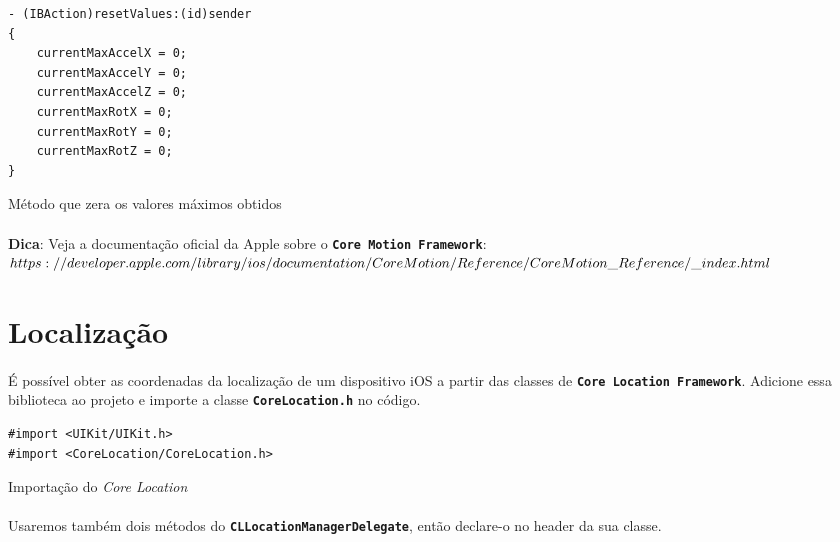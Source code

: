 \documentclass[a4paper,12pt,brazil,doubleside]{book}
\begin{document}
\begin{singlespace}
\begin{listing}[H]
\begin{verbatim}
- (IBAction)resetValues:(id)sender
{
    currentMaxAccelX = 0;
    currentMaxAccelY = 0;
    currentMaxAccelZ = 0;
    currentMaxRotX = 0;
    currentMaxRotY = 0;
    currentMaxRotZ = 0;
}
\end{verbatim}
\caption{Método que zera os valores máximos obtidos}
\end{listing}

\bigskip

\begin{framed}
\paragraph{}\textbf{Dica}: Veja a documentação oficial da Apple sobre o \texttt{\textbf{Core Motion Framework}}:\\
\(https://developer.apple.com/library/ios/documentation/CoreMotion/Reference/\\CoreMotion\_Reference/\_index.html\)

\end{framed}

\section{Localização}

\paragraph{}É possível obter as coordenadas da localização de um dispositivo iOS a partir das classes de \texttt{\textbf{Core Location Framework}}. Adicione essa biblioteca ao projeto e importe a classe \texttt{\textbf{CoreLocation.h}} no código.

\begin{listing}[H]
\begin{verbatim}
#import <UIKit/UIKit.h>
#import <CoreLocation/CoreLocation.h>
\end{verbatim}
\caption{Importação do \emph{Core Location}}
\end{listing}

\paragraph{}Usaremos também dois métodos do \texttt{\textbf{CLLocationManagerDelegate}}, então declare-o no header da sua classe.


\end{singlespace}
\end{document}
